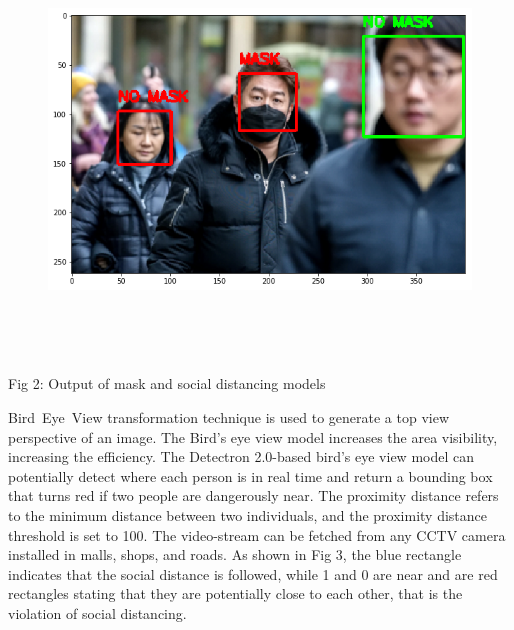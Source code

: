 \documentclass[12pt]{article}
\begin{document}

\begin{figure}[H]
	\begin{Center}
		\includegraphics[width=6.26in,height=4.3in]{./media/image10.png}
	\end{Center}
\end{figure}




\vspace{\baselineskip}\begin{Center}
Fig 2: Output of mask and social distancing models
\end{Center}
\begin{Center}
 
\end{Center}
\begin{Center}
 
\end{Center}
\begin{Center}
 
\end{Center}
\begin{justify}
Bird\ Eye\ View transformation technique is used  to generate a top view perspective of an image. The Bird’s eye view model increases the area visibility, increasing the efficiency. The Detectron 2.0-based bird's eye view model can potentially detect where each person is in real time and return a bounding box that turns red if two people are dangerously near. The proximity distance refers to the minimum distance between two individuals, and the proximity distance threshold is set to 100. The video-stream can be fetched from any CCTV camera installed in malls, shops, and roads.  As shown in Fig 3, the blue rectangle indicates that the social distance is followed, while 1 and 0 are near and are red rectangles stating that they are potentially close to each other, that is the violation of social distancing.
\end{justify}
\vspace{\baselineskip}
\vspace{\baselineskip}
\end{document}
